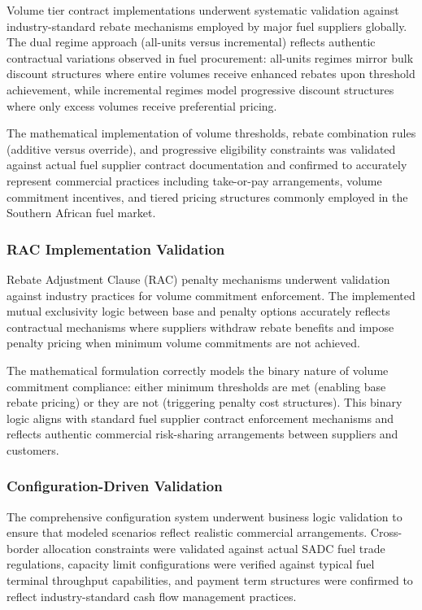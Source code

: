Volume tier contract implementations underwent systematic validation against industry-standard rebate mechanisms employed by major fuel suppliers globally. The dual regime approach (all-units versus incremental) reflects authentic contractual variations observed in fuel procurement: all-units regimes mirror bulk discount structures where entire volumes receive enhanced rebates upon threshold achievement, while incremental regimes model progressive discount structures where only excess volumes receive preferential pricing.

The mathematical implementation of volume thresholds, rebate combination rules (additive versus override), and progressive eligibility constraints was validated against actual fuel supplier contract documentation and confirmed to accurately represent commercial practices including take-or-pay arrangements, volume commitment incentives, and tiered pricing structures commonly employed in the Southern African fuel market.

\subsubsection{RAC Implementation Validation}

Rebate Adjustment Clause (RAC) penalty mechanisms underwent validation against industry practices for volume commitment enforcement. The implemented mutual exclusivity logic between base and penalty options accurately reflects contractual mechanisms where suppliers withdraw rebate benefits and impose penalty pricing when minimum volume commitments are not achieved.

The mathematical formulation correctly models the binary nature of volume commitment compliance: either minimum thresholds are met (enabling base rebate pricing) or they are not (triggering penalty cost structures). This binary logic aligns with standard fuel supplier contract enforcement mechanisms and reflects authentic commercial risk-sharing arrangements between suppliers and customers.

\subsubsection{Configuration-Driven Validation}

The comprehensive configuration system underwent business logic validation to ensure that modeled scenarios reflect realistic commercial arrangements. Cross-border allocation constraints were validated against actual SADC fuel trade regulations, capacity limit configurations were verified against typical fuel terminal throughput capabilities, and payment term structures were confirmed to reflect industry-standard cash flow management practices.

